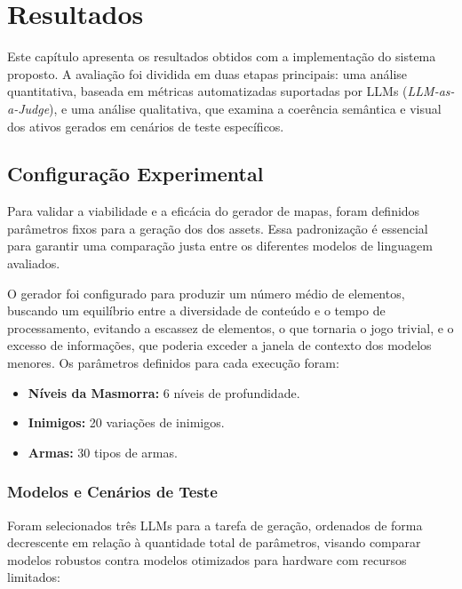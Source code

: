 \chapter{Resultados}
\label{chap:resultados}

Este capítulo apresenta os resultados obtidos com a implementação do sistema
proposto. A avaliação foi dividida em duas etapas principais: uma análise
quantitativa, baseada em métricas automatizadas suportadas por \gls{LLM}s
(\textit{LLM-as-a-Judge}), e uma análise qualitativa, que examina a coerência
semântica e visual dos ativos gerados em cenários de teste específicos.

\section{Configuração Experimental}
\label{sec:configuracao_experimental}

Para validar a viabilidade e a eficácia do gerador de mapas, foram definidos
parâmetros fixos para a geração dos dos assets. Essa padronização é essencial
para garantir uma comparação justa entre os diferentes modelos de linguagem
avaliados.

O gerador foi configurado para produzir um número médio de elementos, buscando
um equilíbrio entre a diversidade de conteúdo e o tempo de processamento,
evitando a escassez de elementos, o que tornaria o jogo trivial, e o excesso de
informações, que poderia exceder a janela de contexto dos modelos menores. Os
parâmetros definidos para cada execução foram:

\begin{itemize}
    \item \textbf{Níveis da Masmorra:} 6 níveis de profundidade.
    \item \textbf{Inimigos:} 20 variações de inimigos.
    \item \textbf{Armas:} 30 tipos de armas.
\end{itemize}

\subsection{Modelos e Cenários de Teste}

Foram selecionados três \gls{LLM}s para a tarefa de geração, ordenados de forma
decrescente em relação à quantidade total de parâmetros, visando comparar
modelos robustos contra modelos otimizados para hardware com recursos limitados:

